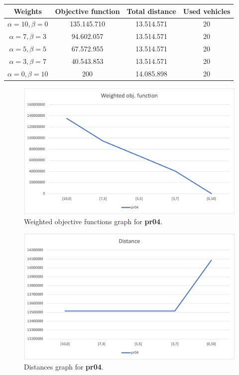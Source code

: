 {
\renewcommand{\arraystretch}{2}
\begin{longtable}[h]{| c | c | c | c |}
    \hline
    \textbf{Weights} & \textbf{Objective function} & \textbf{Total distance} & \textbf{Used vehicles} \\
    \hline
    \endhead
    $\alpha = 10, \beta = 0$ & 135.145.710 & 13.514.571 & 20 \\
    \hline
    $\alpha = 7, \beta = 3$  &  94.602.057 & 13.514.571 & 20 \\
    \hline
    $\alpha = 5, \beta = 5$  &  67.572.955 & 13.514.571 & 20 \\
    \hline
    $\alpha = 3, \beta = 7$  &  40.543.853 & 13.514.571 & 20 \\
    \hline
    $\alpha = 0, \beta = 10$ &         200 & 14.085.898 & 20 \\
    \hline
\end{longtable}
}
\begin{figure}[H]
    \centering
    \includegraphics[height=0.25\textheight]{../graphs/pr04-wobjf.png}
    \caption{Weighted objective functions graph for \textbf{pr04}.}
\end{figure}

\begin{figure}[H]
    \centering
    \includegraphics[height=0.25\textheight]{../graphs/pr04-distance.png}
    \caption{Distances graph for \textbf{pr04}.}
\end{figure}

